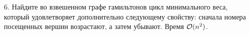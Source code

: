 \begin{enumerate}
  \item[6.]
    Найдите во взвешенном графе гамильтонов цикл
    минимального веса, который удовлетворяет дополнительно следующему свойству: сначала
    номера посещенных вершин возрастают, а затем убывают. Время $\mathcal{O}(n^2)$.






\end{enumerate}

